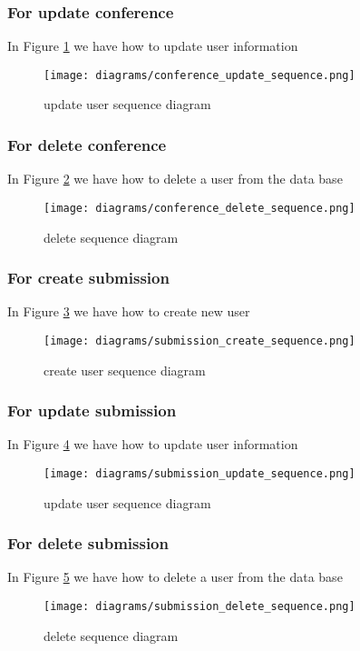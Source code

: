 	\subsubsection{For update conference}
	In Figure \ref{fig:conference-update-s-d} we have how to update user information
	
		\begin{figure}[b]
			\centering
			\texttt{[image: diagrams/conference\_update\_sequence.png]}
			\caption{update user sequence diagram}
			\label{fig:conference-update-s-d}
		\end{figure}
	
	\subsubsection{For delete conference}
	In Figure \ref{fig:conference-delete-s-d} we have how to delete a user from the data base
	
		\begin{figure}[b]
			\centering
			\texttt{[image: diagrams/conference\_delete\_sequence.png]}
			\caption{delete sequence diagram}
			\label{fig:conference-delete-s-d}
		\end{figure}
	
	\subsubsection{For create submission}
	In Figure \ref{fig:submission-create-s-d} we have how to create new user
	
		\begin{figure}[b]
			\centering
			\texttt{[image: diagrams/submission\_create\_sequence.png]}
			\caption{create user sequence diagram}
			\label{fig:submission-create-s-d}
		\end{figure}
	
	\subsubsection{For update submission}
	In Figure \ref{fig:submission-update-s-d} we have how to update user information
	
		\begin{figure}[b]
			\centering
			\texttt{[image: diagrams/submission\_update\_sequence.png]}
			\caption{update user sequence diagram}
			\label{fig:submission-update-s-d}
		\end{figure}
	
	\subsubsection{For delete submission}
	In Figure \ref{fig:submission-delete-s-d} we have how to delete a user from the data base
	
		\begin{figure}[b]
			\centering
			\texttt{[image: diagrams/submission\_delete\_sequence.png]}
			\caption{delete sequence diagram}
			\label{fig:submission-delete-s-d}
		\end{figure}